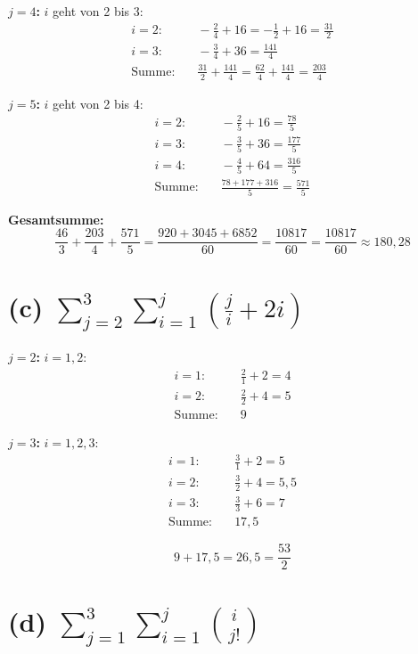 \documentclass[12pt, a4paper]{article}
\begin{document}
\textbf{$j = 4$:} $i$ geht von 2 bis 3:
\begin{align*}
    i=2:& \quad -\frac{2}{4} + 16 = -\frac{1}{2} + 16 = \frac{31}{2} \\
    i=3:& \quad -\frac{3}{4} + 36 = \frac{141}{4} \\
    \text{Summe:}& \quad \frac{31}{2} + \frac{141}{4} = \frac{62}{4} + \frac{141}{4} = \frac{203}{4}
\end{align*}

\textbf{$j = 5$:} $i$ geht von 2 bis 4:
\begin{align*}
    i=2:& \quad -\frac{2}{5} + 16 = \frac{78}{5} \\
    i=3:& \quad -\frac{3}{5} + 36 = \frac{177}{5} \\
    i=4:& \quad -\frac{4}{5} + 64 = \frac{316}{5} \\
    \text{Summe:}& \quad \frac{78 + 177 + 316}{5} = \frac{571}{5}
\end{align*}

\textbf{Gesamtsumme:}
\[
    \frac{46}{3} + \frac{203}{4} + \frac{571}{5} = \frac{920 + 3045 + 6852}{60} = \frac{10817}{60} = \boxed{\frac{10817}{60} \approx 180{,}28}
\]

\section*{(c) $\displaystyle\sum_{j=2}^{3} \sum_{i=1}^{j} \left(\frac{j}{i} + 2i\right)$}

\textbf{$j = 2$:} $i = 1, 2$:
\begin{align*}
    i=1:& \quad \frac{2}{1} + 2 = 4 \\
    i=2:& \quad \frac{2}{2} + 4 = 5 \\
    \text{Summe:}& \quad 9
\end{align*}

\textbf{$j = 3$:} $i = 1, 2, 3$:
\begin{align*}
    i=1:& \quad \frac{3}{1} + 2 = 5 \\
    i=2:& \quad \frac{3}{2} + 4 = 5{,}5 \\
    i=3:& \quad \frac{3}{3} + 6 = 7 \\
    \text{Summe:}& \quad 17{,}5
\end{align*}

\[
    \boxed{9 + 17{,}5 = 26{,}5 = \frac{53}{2}}
\]

\section*{(d) $\displaystyle\sum_{j=1}^{3} \sum_{i=1}^{j} \binom{i}{j!}$}
\end{document}
